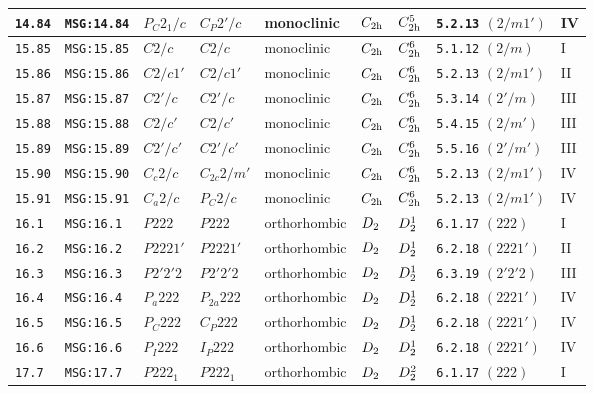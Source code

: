 \documentclass[fleqn,10pt]{jsarticle}
\begin{document}
\begin{center}
\begin{longtable}{lllllllll}
\texttt{14.84} & \texttt{MSG:14.84} & $P_{C}2_{1}/c$ & $C_{P}2'/c$ & monoclinic & $C_{\rm 2h}$ & $C_{\rm 2h}^{5}$ & \texttt{5.2.13} $(2/m1')$ & IV \\ \hline
\texttt{15.85} & \texttt{MSG:15.85} & $C2/c$ & $C2/c$ & monoclinic & $C_{\rm 2h}$ & $C_{\rm 2h}^{6}$ & \texttt{5.1.12} $(2/m)$ & I \\
\texttt{15.86} & \texttt{MSG:15.86} & $C2/c1'$ & $C2/c1'$ & monoclinic & $C_{\rm 2h}$ & $C_{\rm 2h}^{6}$ & \texttt{5.2.13} $(2/m1')$ & II \\
\texttt{15.87} & \texttt{MSG:15.87} & $C2'/c$ & $C2'/c$ & monoclinic & $C_{\rm 2h}$ & $C_{\rm 2h}^{6}$ & \texttt{5.3.14} $(2'/m)$ & III \\
\texttt{15.88} & \texttt{MSG:15.88} & $C2/c'$ & $C2/c'$ & monoclinic & $C_{\rm 2h}$ & $C_{\rm 2h}^{6}$ & \texttt{5.4.15} $(2/m')$ & III \\
\texttt{15.89} & \texttt{MSG:15.89} & $C2'/c'$ & $C2'/c'$ & monoclinic & $C_{\rm 2h}$ & $C_{\rm 2h}^{6}$ & \texttt{5.5.16} $(2'/m')$ & III \\
\texttt{15.90} & \texttt{MSG:15.90} & $C_{c}2/c$ & $C_{2c}2/m'$ & monoclinic & $C_{\rm 2h}$ & $C_{\rm 2h}^{6}$ & \texttt{5.2.13} $(2/m1')$ & IV \\
\texttt{15.91} & \texttt{MSG:15.91} & $C_{a}2/c$ & $P_{C}2/c$ & monoclinic & $C_{\rm 2h}$ & $C_{\rm 2h}^{6}$ & \texttt{5.2.13} $(2/m1')$ & IV \\ \hline
\texttt{16.1} & \texttt{MSG:16.1} & $P222$ & $P222$ & orthorhombic & $D_{\rm 2}$ & $D_{\rm 2}^{1}$ & \texttt{6.1.17} $(222)$ & I \\
\texttt{16.2} & \texttt{MSG:16.2} & $P2221'$ & $P2221'$ & orthorhombic & $D_{\rm 2}$ & $D_{\rm 2}^{1}$ & \texttt{6.2.18} $(2221')$ & II \\
\texttt{16.3} & \texttt{MSG:16.3} & $P2'2'2$ & $P2'2'2$ & orthorhombic & $D_{\rm 2}$ & $D_{\rm 2}^{1}$ & \texttt{6.3.19} $(2'2'2)$ & III \\
\texttt{16.4} & \texttt{MSG:16.4} & $P_{a}222$ & $P_{2a}222$ & orthorhombic & $D_{\rm 2}$ & $D_{\rm 2}^{1}$ & \texttt{6.2.18} $(2221')$ & IV \\
\texttt{16.5} & \texttt{MSG:16.5} & $P_{C}222$ & $C_{P}222$ & orthorhombic & $D_{\rm 2}$ & $D_{\rm 2}^{1}$ & \texttt{6.2.18} $(2221')$ & IV \\
\texttt{16.6} & \texttt{MSG:16.6} & $P_{I}222$ & $I_{P}222$ & orthorhombic & $D_{\rm 2}$ & $D_{\rm 2}^{1}$ & \texttt{6.2.18} $(2221')$ & IV \\ \hline
\texttt{17.7} & \texttt{MSG:17.7} & $P222_{1}$ & $P222_{1}$ & orthorhombic & $D_{\rm 2}$ & $D_{\rm 2}^{2}$ & \texttt{6.1.17} $(222)$ & I \\

\end{longtable}
\end{center}
\end{document}
